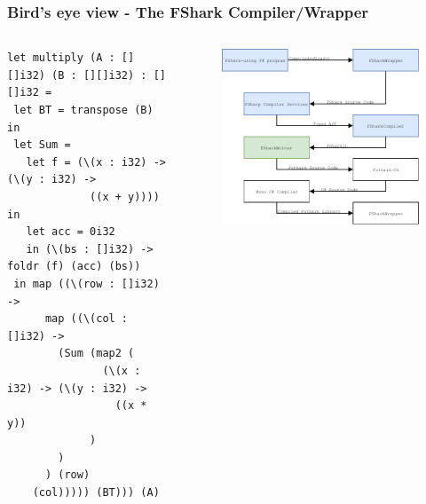 \documentclass[10pt, compress, usenames, dvipsnames]{beamer}
\begin{document}
\begin{frame}[fragile]
  \frametitle{Bird's eye view - The FShark Compiler/Wrapper}
\begin{columns}[t] %
\begin{column}{.38\textwidth}
    \begin{verbatim}
let multiply (A : [][]i32) (B : [][]i32) : [][]i32 =
 let BT = transpose (B) in
 let Sum =
   let f = (\(x : i32) -> (\(y : i32) ->
             ((x + y)))) in
   let acc = 0i32 
   in (\(bs : []i32) -> foldr (f) (acc) (bs))
 in map ((\(row : []i32) -> 
      map ((\(col : []i32) -> 
        (Sum (map2 (
               (\(x : i32) -> (\(y : i32) -> 
                 ((x * y))
             )
        )
      ) (row) 
    (col))))) (BT))) (A)
    \end{verbatim}
\end{column}
\hfill
\begin{column}{.60\textwidth}
  \begin{figure}
    \includegraphics[scale=0.7]{./images/pipeline/pipeline6}
  \end{figure}
\end{column}
\end{columns}
\end{frame}
\end{document}
